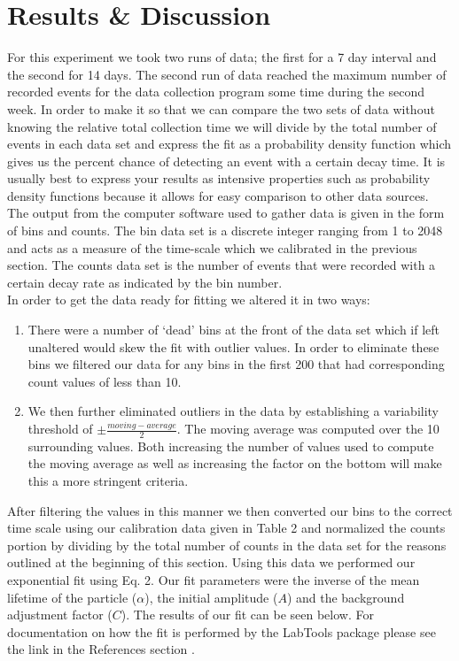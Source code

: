 \section{Results \& Discussion}
\indent \indent For this experiment we took two runs of data; the first for a 7 day interval and the second for 14 days.  The second run of data reached the maximum number of recorded events for the data collection program some time during the second week. In order to make it so that we can compare the two sets of data without knowing the relative total collection time we will divide by the total number of events in each data set and express the fit as a probability density function which gives us the percent chance of detecting an event with a certain decay time. It is usually best to express your results as intensive properties such as probability density functions because it allows for easy comparison to other data sources.\\
\indent \indent The output from the computer software used to gather data is given in the form of bins and counts.  The bin data set is a discrete integer ranging from 1 to 2048 and acts as a measure of the time-scale which we calibrated in the previous section.  The counts data set is the number of events that were recorded with a certain decay rate as indicated by the bin number.\\
\indent \indent In order to get the data ready for fitting we altered it in two ways:
\begin{enumerate}
\item There were a number of `dead' bins at the front of the data set which if left unaltered would skew the fit with outlier values.  In order to eliminate these bins we filtered our data for any bins in the first 200 that had corresponding count values of less than 10.  
\item We then further eliminated outliers in the data by establishing a variability threshold of $\pm \frac{moving-average}{2}$.  The moving average was computed over the 10 surrounding values.  Both increasing  the number of values used to compute the moving average as well as increasing the factor on the bottom will make this a more stringent criteria.
\end{enumerate}
\indent \indent After filtering the values in this manner we then converted our bins to the correct time scale using our calibration data given in Table 2 and normalized the counts portion by dividing by the total number of counts in the data set for the reasons outlined at the beginning of this section. Using this data we performed our exponential fit using Eq. 2. Our fit parameters were the inverse of the mean lifetime of the particle ($\alpha$), the initial amplitude ($A$) and the background adjustment factor ($C$). The results of our fit can be seen below. For documentation on how the fit is performed by the LabTools package please see the link in the References section \cite{LabTools}.

